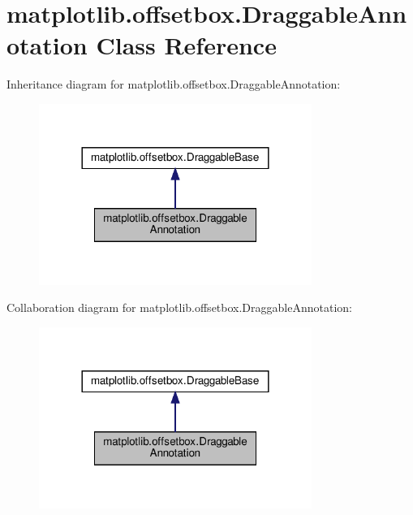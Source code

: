 \hypertarget{classmatplotlib_1_1offsetbox_1_1DraggableAnnotation}{}\section{matplotlib.\+offsetbox.\+Draggable\+Annotation Class Reference}
\label{classmatplotlib_1_1offsetbox_1_1DraggableAnnotation}


Inheritance diagram for matplotlib.\+offsetbox.\+Draggable\+Annotation\+:
\nopagebreak
\begin{figure}[H]
\begin{center}
\leavevmode
\includegraphics[width=252pt]{classmatplotlib_1_1offsetbox_1_1DraggableAnnotation__inherit__graph}
\end{center}
\end{figure}


Collaboration diagram for matplotlib.\+offsetbox.\+Draggable\+Annotation\+:
\nopagebreak
\begin{figure}[H]
\begin{center}
\leavevmode
\includegraphics[width=252pt]{classmatplotlib_1_1offsetbox_1_1DraggableAnnotation__coll__graph}
\end{center}
\end{figure}
